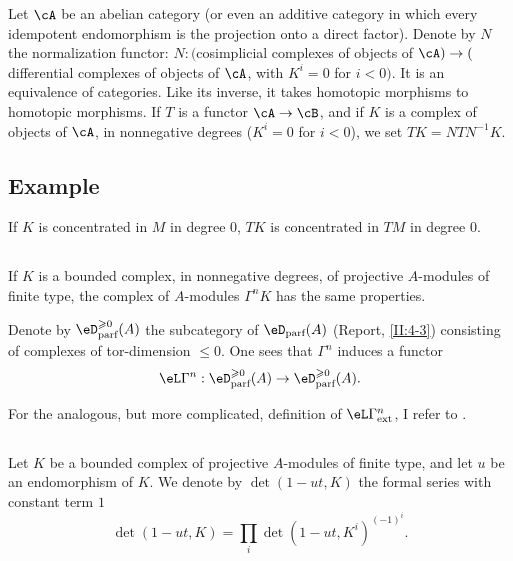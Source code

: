 Let $\cA$ be an abelian category (or even an additive category in which every
idempotent endomorphism is the projection onto a direct factor). Denote by $N$
the normalization functor: $N:($cosimplicial complexes of objects of
$\cA)\to($differential complexes of objects of $\cA$, with $K^i=0$ for
$i<0)$. It is an equivalence of categories. Like its inverse, it takes
homotopic morphisms to homotopic morphisms. If $T$ is a functor
$\cA\to\cB$, and if $K$ is a complex of objects of $\cA$, in nonnegative
degrees ($K^i=0$ for $i<0$), we set $T K=N T N^{-1} K$.





\subsection{Example}\label{III:1-5}

If $K$ is concentrated in $M$ in degree $0$, $T K$ is concentrated in $T M$
in degree $0$.






\subsection{}\label{III:1-6}

If $K$ is a bounded complex, in nonnegative degrees, of projective
$A$-modules of finite type, the complex of $A$-modules $\Gamma^n K$ has the
same properties.

Denote by $\eD_\text{parf}^{\geqslant 0}(A)$ the subcategory of
$\eD_\text{parf}(A)$ (Report, \ref{II:4-3}) consisting of complexes of
tor-dimension $\leqslant 0$. One sees that $\Gamma^n$ induces a functor
\[
  \eL\Gamma^n : \eD_\text{parf}^{\geqslant 0}(A) \to \eD_\text{parf}^{\geqslant 0}(A) \text{.}
\]

For the analogous, but more complicated, definition of
$\eL\Gamma_\text{ext}^n$, I refer to .






\subsection{}\label{III:1-7}

Let $K$ be a bounded complex of projective $A$-modules of finite type, and let
$u$ be an endomorphism of $K$. We denote by $\det(1-u t,K)$ the formal series
with constant term $1$
\[
  \det(1-u t,K) = \prod_i \det(1-u t,K^i)^{(-1)^i} \text{.}
\]

